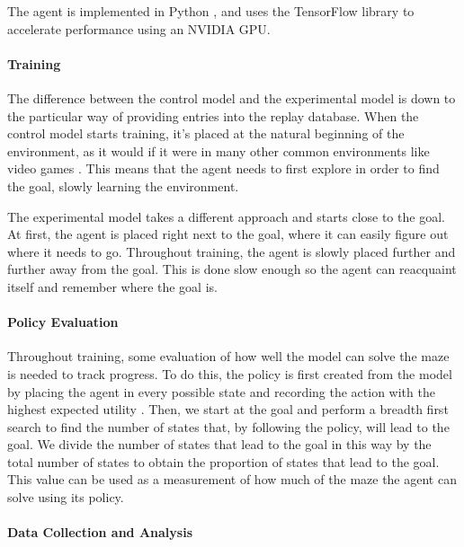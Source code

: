 \documentclass[12pt]{article}
\begin{document}
The agent is implemented in Python \cite{lang_python}, and uses the TensorFlow \cite{lib_tensorflow} library to accelerate performance using an NVIDIA GPU.


%


\paragraph{Training} 
The difference between the control model and the experimental model is down to the particular way of providing entries into the replay database.
When the control model starts training, it's placed at the natural beginning of the environment, as it would if it were in many other common environments like video games \cite{article_reinforcement_learning_survey}.
This means that the agent needs to first explore in order to find the goal, slowly learning the environment.

The experimental model takes a different approach and starts close to the goal.
At first, the agent is placed right next to the goal, where it can easily figure out where it needs to go.
Throughout training, the agent is slowly placed further and further away from the goal.
This is done slow enough so the agent can reacquaint itself and remember where the goal is.


\paragraph{Policy Evaluation}

Throughout training, some evaluation of how well the model can solve the maze is needed to track progress.
To do this, the policy is first created from the model by placing the agent in every possible state and recording the action with the highest expected utility \cite{article_reinforcement_learning_survey}.
Then, we start at the goal and perform a breadth first search to find the number of states that, by following the policy, will lead to the goal.
We divide the number of states that lead to the goal in this way by the total number of states to obtain the proportion of states that lead to the goal.
This value can be used as a measurement of how much of the maze the agent can solve using its policy.

\paragraph{Data Collection and Analysis}
\end{document}
